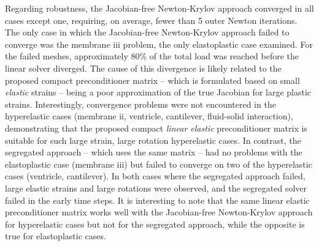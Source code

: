 \documentclass[sn-mathphys,Numbered]{sn-jnl}%
\begin{document}
%

Regarding robustness, the Jacobian-free Newton-Krylov approach converged in all cases except one, requiring, on average, fewer than 5 outer Newton iterations.
The only case in which the Jacobian-free Newton-Krylov approach failed to converge was the membrane iii problem, the only elastoplastic case examined.
For the failed meshes, approximately 80\% of the total load was reached before the linear solver diverged.
The cause of this divergence is likely related to the proposed compact preconditioner matrix -- which is formulated based on small \emph{elastic} strains -- being a poor approximation of the true Jacobian for large plastic strains.
Interestingly, convergence problems were not encountered in the hyperelastic cases (membrane ii, ventricle, cantilever, fluid-solid interaction), demonstrating that the proposed compact \emph{linear elastic} preconditioner matrix is suitable for such large strain, large rotation hyperelastic cases.
In contrast, the segregated approach -- which uses the same matrix -- had no problems with the elastoplastic case (membrane iii) but failed to converge on two of the hyperelastic cases (ventricle, cantilever).
In both cases where the segregated approach failed, large elastic strains and large rotations were observed, and the segregated solver failed in the early time steps.
It is interesting to note that the same linear elastic preconditioner matrix works well with the Jacobian-free Newton-Krylov approach for hyperelastic cases but not for the segregated approach, while the opposite is true for elastoplastic cases.
\end{document}
